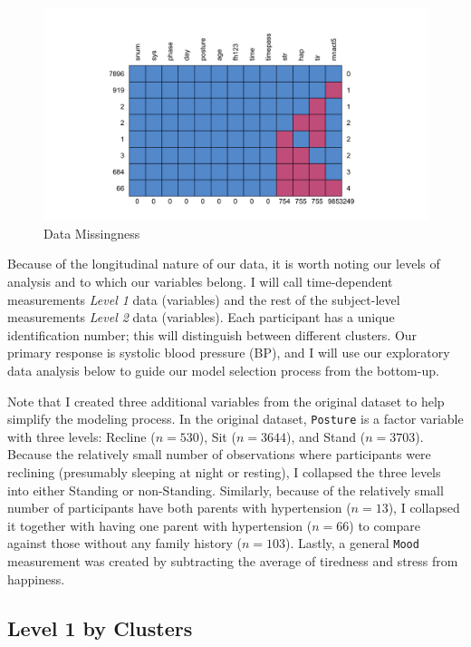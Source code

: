 \documentclass[12pt,twoside,leqno,fleqn,letterpaper]{article}
\theoremstyle{definition}
\theoremstyle{definition}
\begin{document}
\begin{figure}
\centering
\includegraphics[width=\textwidth]{pics/miss.png}
\caption{Data Missingness}
\label{fig: missing}
\end{figure}

Because of the longitudinal nature of our data, it is worth noting our levels of analysis and to which our variables belong. I will call time-dependent measurements \emph{\textcolor[RGB]{208, 2, 27}{Level 1}} data (variables) and the rest of the subject-level measurements \emph{\textcolor[RGB]{74, 144, 226}{Level 2}} data (variables). Each participant has a unique identification number; this will distinguish between different clusters. Our primary response is systolic blood pressure (BP), and I will use our exploratory data analysis below to guide our model selection process from the bottom-up.

Note that I created three additional variables from the original dataset to help simplify the modeling process. In the original dataset, \texttt{Posture} is a factor variable with three levels: Recline ($n = 530$), Sit ($n = 3644$), and Stand ($n = 3703$). Because the relatively small number of observations where participants were reclining (presumably sleeping at night or resting), I collapsed the three levels into either Standing or non-Standing. Similarly, because of the relatively small number of participants have both parents with hypertension ($n = 13$), I collapsed it together with having one parent with hypertension ($n = 66$) to compare against those without any family history ($n = 103$). Lastly, a general \texttt{Mood} measurement was created by subtracting the average of tiredness and stress from happiness. 

\subsection{Level 1 by Clusters}\label{sec: lv1}
\end{document}
